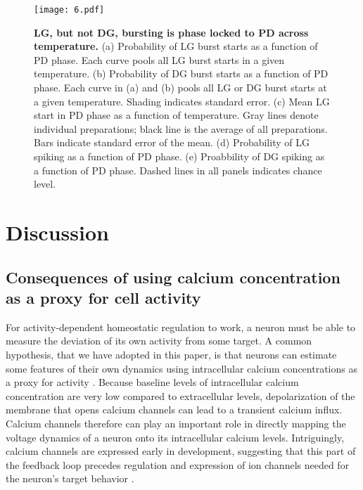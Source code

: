 \documentclass[9pt,lineno]{elife}
\begin{document}
\begin{figure}[!htp]
\centering
\begin{fullwidth}
\texttt{[image: 6.pdf]}
\end{fullwidth}
\caption{\textbf{LG, but not DG, bursting is phase locked to PD across temperature.} (a) Probability of LG burst starts as a function of PD phase. Each curve pools all LG burst starts in a given temperature.  (b) Probability of DG burst starts as a function of PD phase. Each curve in (a) and (b) pools all LG or DG burst starts at a given temperature. Shading indicates standard error.  (c) Mean LG start in PD phase as a function of temperature. Gray lines denote individual preparations; black line is the average of all preparations. Bars indicate standard error of the mean. (d) Probability of LG spiking as a function of PD phase. (e) Proabbility of DG spiking as a function of PD phase.  Dashed lines in all panels indicates chance level.}
\end{figure}


\section{Discussion}




\subsection{Consequences of using calcium concentration as a proxy for cell activity}

For activity-dependent homeostatic regulation to work, a neuron must be able to measure the deviation of its own activity from some target. A common hypothesis, that we have adopted in this paper, is that neurons can estimate some features of their own dynamics using intracellular calcium concentrations as a proxy for activity \citep{LeMasson:1993jz,Siegel:1994ue,Gunay:2010jh,Golowasch:1999ha,Davis:2006wd,OLeary:2011fd}. Because baseline levels of intracellular calcium concentration are very low compared to extracellular levels, depolarization of the membrane that opens calcium channels can lead to a transient calcium influx. Calcium channels therefore can play an important role in directly mapping the voltage dynamics of a neuron onto its intracellular calcium levels. Intriguingly, calcium channels are expressed early in development, suggesting that this part of the feedback loop precedes regulation and expression of ion channels needed for the neuron's target behavior \citep{Baccaglini:1977, Liljelund:2000em, Yamashita:1993fy, Faure:2001gg,Heusser:2005jz}.
\end{document}
